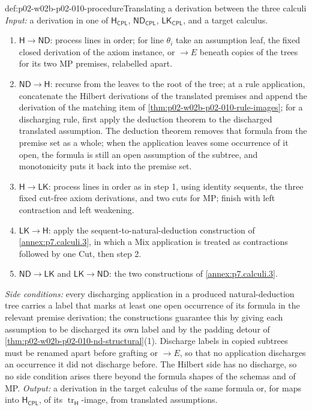 \begin{hbmethod}{def:p02-w02b-p02-010-procedure}{Translating a derivation between the three calculi}
\emph{Input:} a derivation in one of \(\mathsf H_{\mathsf{CPL}}\),
\(\mathsf{ND}_{\mathsf{CPL}}\), \(\mathsf{LK}_{\mathsf{CPL}}\), and a target
calculus.
\begin{enumerate}
  \item \(\mathsf H\to\mathsf{ND}\): process lines in order; for line
    \(\theta_i\) take an assumption leaf, the fixed closed derivation of the
    axiom instance, or \(\to E\) beneath copies of the trees for its two
    MP premises, relabelled apart.
  \item \(\mathsf{ND}\to\mathsf H\): recurse from the leaves to the root of
    the tree; at a rule application, concatenate the Hilbert derivations of
    the translated premises and append the derivation of the matching item
    of \cref{thm:p02-w02b-p02-010-rule-images}; for a discharging rule, first
    apply the deduction theorem to the discharged translated assumption.
    The deduction theorem removes that formula from the premise set as a
    whole; when the application leaves some occurrence of it open, the
    formula is still an open assumption of the subtree, and monotonicity
    puts it back into the premise set.
  \item \(\mathsf H\to\mathsf{LK}\): process lines in order as in step 1,
    using identity sequents, the three fixed cut-free axiom derivations, and
    two cuts for MP; finish with left contraction and left weakening.
  \item \(\mathsf{LK}\to\mathsf H\): apply the sequent-to-natural-deduction
    construction of \cref{annex:p7.calculi.3}, in which a Mix application
    is treated as contractions followed by one Cut, then step 2.
  \item \(\mathsf{ND}\to\mathsf{LK}\) and \(\mathsf{LK}\to\mathsf{ND}\): the
    two constructions of \cref{annex:p7.calculi.3}.
\end{enumerate}
\emph{Side conditions:} every discharging application in a produced
natural-deduction tree carries a label that marks at least one open
occurrence of its formula in the relevant premise derivation; the
constructions guarantee this by giving each assumption to be discharged its
own label and by the padding detour of
\cref{thm:p02-w02b-p02-010-nd-structural}(1).  Discharge labels in copied
subtrees must be renamed apart before grafting or \(\to E\), so that no
application discharges an occurrence it did not discharge before.  The Hilbert side has no discharge, so no side condition arises
there beyond the formula shapes of the schemas and of MP.
\emph{Output:} a derivation in the target calculus of the same formula or,
for maps into \(\mathsf H_{\mathsf{CPL}}\), of its
\(\operatorname{tr}_{\mathsf H}\)-image, from translated assumptions.
\end{hbmethod}

